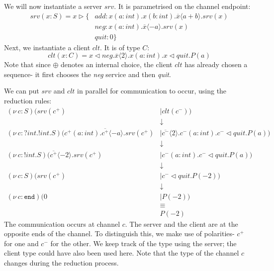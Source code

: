 \documentclass[a4paper, openany]{memoir}
\theoremstyle{definition}
\begin{document}
    We will now instantiate a server $srv$. It is parametrised on the channel endpoint:
    \begin{align*}
        srv(x \colon S) = x \vartriangleright \{ &\textit{add} \colon x(a \colon \textit{int}). x(b \colon\textit{int}). \overline{x} \langle a + b \rangle. srv(x) \\
        & \textit{neg} \colon x(a \colon \textit{int}). \overline{x}\langle -a \rangle. srv(x) \\
        & \textit{quit} \colon 0 \}
    \end{align*}
    Next, we instantiate a client $clt$. It is of type $C$:
    \[clt(x \colon C) = x \vartriangleleft \textit{neg}.\overline{x} \langle 2 \rangle.x(a \colon \textit{int}).x \vartriangleleft \textit{quit}.P(a)\]
    Note that since $\oplus$ denotes an internal choice, the client $clt$ has already chosen a sequence- it first chooses the \textit{neg} service and then \textit{quit}.

    We can put $srv$ and $clt$ in parallel for communication to occur, using the reduction rules:
    \begin{align*}
        (\nu \ c \colon S)(srv(c^+) &\mid clt(c^-)) \\
        &\downarrow \\
        (\nu \ c \colon ?\textit{int}.!\textit{int}.S)(c^+(a \colon \textit{int}).\overline{c^+}\langle -a \rangle.srv(c^+) &\mid \overline{c^-}\langle 2 \rangle. c^-(a \colon \textit{int}).c^{-} \vartriangleleft \textit{quit}.P(a)) \\
        &\downarrow \\
        (\nu \ c \colon !\textit{int}.S)(\overline{c^+}\langle -2 \rangle.srv(c^+) &\mid c^-(a \colon \textit{int}). c^- \vartriangleleft \textit{quit}.P(a)) \\
        &\downarrow \\
        (\nu \ c \colon S)(srv(c^+) &\mid c^- \vartriangleleft \textit{quit}.P(-2)) \\
        &\downarrow \\
        (\nu \ c \colon \texttt{end})(0 &\mid P(-2)) \\
        &\equiv \\
        & P(-2)
    \end{align*}
    The communication occurs at channel $c$. The server and the client are at the opposite ends of the channel. To distinguish this, we make use of polarities- $c^+$ for one and $c^-$ for the other. We keep track of the type using the server; the client type could have also been used here. Note that the type of the channel $c$ changes during the reduction process.
\end{document}

